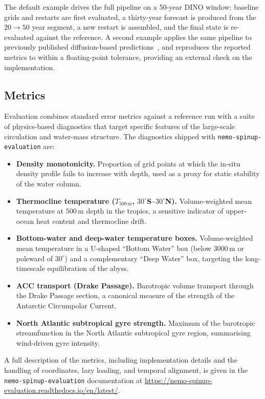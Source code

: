 \documentclass{article}
\begin{document}
The default example drives the full pipeline on a 50-year DINO window:
baseline grids and restarts are first evaluated, a thirty-year forecast
is produced from the $20 \rightarrow 50$ year segment, a new restart is
assembled, and the final state is re-evaluated against the reference. A
second example applies the same pipeline to previously published
diffusion-based predictions~\citep{gorce_physically_2025}, and reproduces
the reported metrics to within a floating-point tolerance, providing an
external check on the implementation.

\subsection{Metrics}
\label{sec:metrics}

Evaluation combines standard error metrics against a reference run
with a suite of physics-based diagnostics that target specific
features of the large-scale circulation and water-mass structure. The
diagnostics shipped with \texttt{nemo-spinup-evaluation} are:

\begin{itemize}
  \item \textbf{Density monotonicity.} Proportion of grid points at
    which the in-situ density profile fails to increase with depth,
    used as a proxy for static stability of the water column.
  \item \textbf{Thermocline temperature ($T_{500\,\mathrm{m}}$,
    $30^{\circ}$S--$30^{\circ}$N).} Volume-weighted mean temperature
    at $500$\,m depth in the tropics, a sensitive indicator of upper-ocean
    heat content and thermocline drift.
  \item \textbf{Bottom-water and deep-water temperature boxes.}
    Volume-weighted mean temperature in a U-shaped ``Bottom Water''
    box (below $3000$\,m or poleward of $30^{\circ}$) and a
    complementary ``Deep Water'' box, targeting the long-timescale
    equilibration of the abyss.
  \item \textbf{ACC transport (Drake Passage).} Barotropic volume
    transport through the Drake Passage section, a canonical measure
    of the strength of the Antarctic Circumpolar Current.
  \item \textbf{North Atlantic subtropical gyre strength.} Maximum of
    the barotropic streamfunction in the North Atlantic subtropical
    gyre region, summarising wind-driven gyre intensity.
\end{itemize}

A full description of the metrics, including implementation details
and the handling of coordinates, lazy loading, and temporal
alignment, is given in the \texttt{nemo-spinup-evaluation}
documentation at \url{https://nemo-spinup-evaluation.readthedocs.io/en/latest/}.
\end{document}

